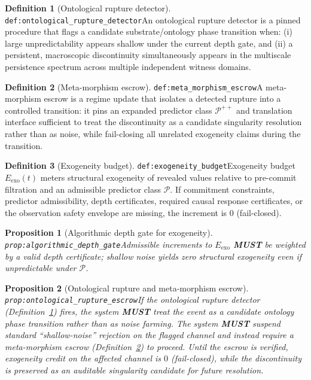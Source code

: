 \documentclass[11pt]{article}
\theoremstyle{definition}
\newtheorem{definition}{Definition}
\theoremstyle{plain}
\newtheorem{proposition}{Proposition}
\newcommand{\MUST}{\textbf{MUST}}
\newcommand{\lbl}[1]{\texttt{\footnotesize\nolinkurl{#1}}}
\newcommand{\DefLabel}[1]{\hfill{\small\lbl{#1}}}
\begin{document}
\begin{definition}[Ontological rupture detector]\DefLabel{def:ontological_rupture_detector}\label{def:ontological_rupture_detector}
An ontological rupture detector is a pinned procedure that flags a candidate substrate/ontology phase transition when:
(i) large unpredictability appears shallow under the current depth gate, and
(ii) a persistent, macroscopic discontinuity simultaneously appears in the multiscale persistence spectrum across multiple independent witness domains.
\end{definition}

\begin{definition}[Meta-morphism escrow]\DefLabel{def:meta_morphism_escrow}\label{def:meta_morphism_escrow}
A meta-morphism escrow is a regime update that isolates a detected rupture into a controlled transition: it pins an expanded predictor class $\mathcal{P}^{++}$ and translation interface sufficient to treat the discontinuity as a candidate singularity resolution rather than as noise, while fail-closing all unrelated exogeneity claims during the transition.
\end{definition}

\begin{definition}[Exogeneity budget]\DefLabel{def:exogeneity_budget}\label{def:exogeneity_budget}
Exogeneity budget $E_{\mathrm{exo}}(t)$ meters structural exogeneity of revealed values relative to pre-commit filtration and an admissible predictor class $\mathcal{P}$.
If commitment constraints, predictor admissibility, depth certificates, required causal response certificates, or the observation safety envelope are missing, the increment is $0$ (fail-closed).
\end{definition}

\begin{proposition}[Algorithmic depth gate for exogeneity]\DefLabel{prop:algorithmic_depth_gate}\label{prop:algorithmic_depth_gate}
Admissible increments to $E_{\mathrm{exo}}$ \MUST{} be weighted by a valid depth certificate; shallow noise yields zero structural exogeneity even if unpredictable under $\mathcal{P}$.
\end{proposition}

\begin{proposition}[Ontological rupture and meta-morphism escrow]\DefLabel{prop:ontological_rupture_escrow}\label{prop:ontological_rupture_escrow}
If the ontological rupture detector (Definition~\ref{def:ontological_rupture_detector}) fires, the system \MUST{} treat the event as a candidate ontology phase transition rather than as noise farming.
The system \MUST{} suspend standard ``shallow-noise'' rejection on the flagged channel and instead require a meta-morphism escrow (Definition~\ref{def:meta_morphism_escrow}) to proceed.
Until the escrow is verified, exogeneity credit on the affected channel is $0$ (fail-closed), while the discontinuity is preserved as an auditable singularity candidate for future resolution.
\end{proposition}
\end{document}
